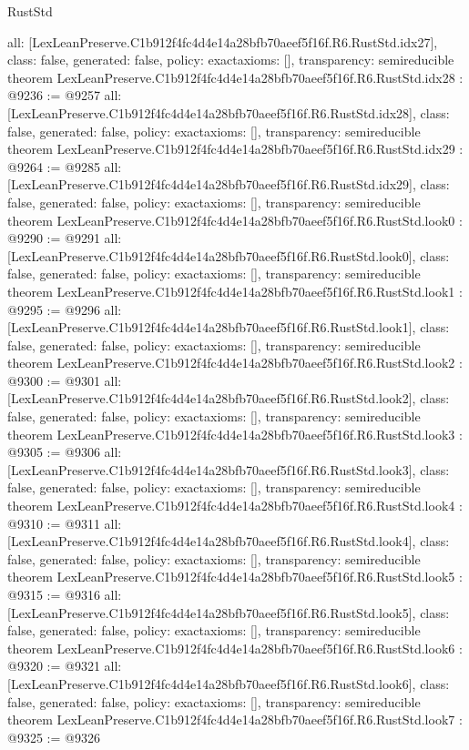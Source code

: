 \begin{lexlean}{RustStd}
\begin{coremodule}
{  all: [LexLeanPreserve.C1b912f4fc4d4e14a28bfb70aeef5f16f.R6.RustStd.idx27],
  class: false,
  generated: false,
  policy: exact{axioms: []},
  transparency: semireducible
}
theorem LexLeanPreserve.C1b912f4fc4d4e14a28bfb70aeef5f16f.R6.RustStd.idx28 : @9236 := @9257 {
  all: [LexLeanPreserve.C1b912f4fc4d4e14a28bfb70aeef5f16f.R6.RustStd.idx28],
  class: false,
  generated: false,
  policy: exact{axioms: []},
  transparency: semireducible
}
theorem LexLeanPreserve.C1b912f4fc4d4e14a28bfb70aeef5f16f.R6.RustStd.idx29 : @9264 := @9285 {
  all: [LexLeanPreserve.C1b912f4fc4d4e14a28bfb70aeef5f16f.R6.RustStd.idx29],
  class: false,
  generated: false,
  policy: exact{axioms: []},
  transparency: semireducible
}
theorem LexLeanPreserve.C1b912f4fc4d4e14a28bfb70aeef5f16f.R6.RustStd.look0 : @9290 := @9291 {
  all: [LexLeanPreserve.C1b912f4fc4d4e14a28bfb70aeef5f16f.R6.RustStd.look0],
  class: false,
  generated: false,
  policy: exact{axioms: []},
  transparency: semireducible
}
theorem LexLeanPreserve.C1b912f4fc4d4e14a28bfb70aeef5f16f.R6.RustStd.look1 : @9295 := @9296 {
  all: [LexLeanPreserve.C1b912f4fc4d4e14a28bfb70aeef5f16f.R6.RustStd.look1],
  class: false,
  generated: false,
  policy: exact{axioms: []},
  transparency: semireducible
}
theorem LexLeanPreserve.C1b912f4fc4d4e14a28bfb70aeef5f16f.R6.RustStd.look2 : @9300 := @9301 {
  all: [LexLeanPreserve.C1b912f4fc4d4e14a28bfb70aeef5f16f.R6.RustStd.look2],
  class: false,
  generated: false,
  policy: exact{axioms: []},
  transparency: semireducible
}
theorem LexLeanPreserve.C1b912f4fc4d4e14a28bfb70aeef5f16f.R6.RustStd.look3 : @9305 := @9306 {
  all: [LexLeanPreserve.C1b912f4fc4d4e14a28bfb70aeef5f16f.R6.RustStd.look3],
  class: false,
  generated: false,
  policy: exact{axioms: []},
  transparency: semireducible
}
theorem LexLeanPreserve.C1b912f4fc4d4e14a28bfb70aeef5f16f.R6.RustStd.look4 : @9310 := @9311 {
  all: [LexLeanPreserve.C1b912f4fc4d4e14a28bfb70aeef5f16f.R6.RustStd.look4],
  class: false,
  generated: false,
  policy: exact{axioms: []},
  transparency: semireducible
}
theorem LexLeanPreserve.C1b912f4fc4d4e14a28bfb70aeef5f16f.R6.RustStd.look5 : @9315 := @9316 {
  all: [LexLeanPreserve.C1b912f4fc4d4e14a28bfb70aeef5f16f.R6.RustStd.look5],
  class: false,
  generated: false,
  policy: exact{axioms: []},
  transparency: semireducible
}
theorem LexLeanPreserve.C1b912f4fc4d4e14a28bfb70aeef5f16f.R6.RustStd.look6 : @9320 := @9321 {
  all: [LexLeanPreserve.C1b912f4fc4d4e14a28bfb70aeef5f16f.R6.RustStd.look6],
  class: false,
  generated: false,
  policy: exact{axioms: []},
  transparency: semireducible
}
theorem LexLeanPreserve.C1b912f4fc4d4e14a28bfb70aeef5f16f.R6.RustStd.look7 : @9325 := @9326 {
}
\end{coremodule}
\end{lexlean}
